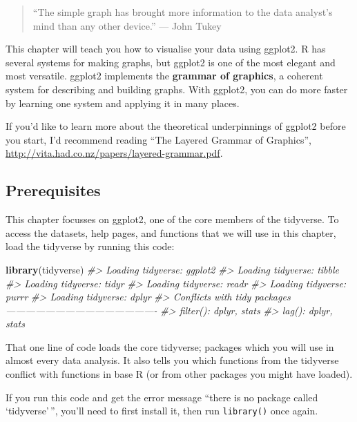 \documentclass[]{book}
\newenvironment{Shaded}{\begin{snugshade}}{\end{snugshade}}
\newcommand{\KeywordTok}[1]{\textcolor[rgb]{0.13,0.29,0.53}{\textbf{{#1}}}}
\newcommand{\CommentTok}[1]{\textcolor[rgb]{0.56,0.35,0.01}{\textit{{#1}}}}
\newcommand{\NormalTok}[1]{{#1}}
\begin{document}
\begin{quote}
``The simple graph has brought more information to the data analyst's
mind than any other device.'' --- John Tukey
\end{quote}

This chapter will teach you how to visualise your data using ggplot2. R
has several systems for making graphs, but ggplot2 is one of the most
elegant and most versatile. ggplot2 implements the \textbf{grammar of
graphics}, a coherent system for describing and building graphs. With
ggplot2, you can do more faster by learning one system and applying it
in many places.

If you'd like to learn more about the theoretical underpinnings of
ggplot2 before you start, I'd recommend reading ``The Layered Grammar of
Graphics'', \url{http://vita.had.co.nz/papers/layered-grammar.pdf}.

\subsection{Prerequisites}\label{prerequisites-1}

This chapter focusses on ggplot2, one of the core members of the
tidyverse. To access the datasets, help pages, and functions that we
will use in this chapter, load the tidyverse by running this code:

\begin{Shaded}
\begin{Highlighting}[]
\KeywordTok{library}\NormalTok{(tidyverse)}
\CommentTok{#> Loading tidyverse: ggplot2}
\CommentTok{#> Loading tidyverse: tibble}
\CommentTok{#> Loading tidyverse: tidyr}
\CommentTok{#> Loading tidyverse: readr}
\CommentTok{#> Loading tidyverse: purrr}
\CommentTok{#> Loading tidyverse: dplyr}
\CommentTok{#> Conflicts with tidy packages ----------------------------------------------}
\CommentTok{#> filter(): dplyr, stats}
\CommentTok{#> lag():    dplyr, stats}
\end{Highlighting}
\end{Shaded}

That one line of code loads the core tidyverse; packages which you will
use in almost every data analysis. It also tells you which functions
from the tidyverse conflict with functions in base R (or from other
packages you might have loaded).

If you run this code and get the error message ``there is no package
called `tidyverse'\,'', you'll need to first install it, then run
\texttt{library()} once again.
\end{document}
